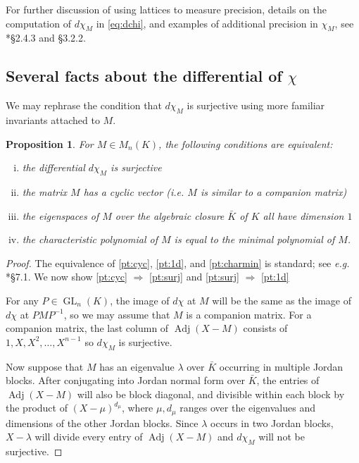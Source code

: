\documentclass[sigconf]{acmart}
\DeclareMathOperator{\GL}{GL}
\DeclareMathOperator{\adj}{Adj}
\newtheorem{prop}[theo]{Proposition}
\theoremstyle{definition}
\begin{document}
For further discussion of using lattices to measure precision,
details on the computation of $d\chi_M$ in \eqref{eq:dchi}, and 
examples of additional precision in $\chi_M$,
see \cite{caruso:17a}*{\S 2.4.3 and \S 3.2.2}.

\subsection{Several facts about the differential of $\chi$}

We may rephrase the condition that $d\chi_M$ is surjective using more familiar invariants attached to $M$.

\begin{prop}
\label{prop:surjectivity}
For $M \in M_n(K)$, the following conditions are equivalent:
\begin{enumerate}[(i)]
\renewcommand{\itemsep}{0pt}
\item \label{pt:surj} the differential $d\chi_M$ is surjective
\item \label{pt:cyc} the matrix $M$ has a cyclic vector (\emph{i.e.} $M$ is similar
to a companion matrix)
\item \label{pt:1d} the eigenspaces of $M$ over the algebraic
closure $\bar{K}$ of $K$ all have dimension $1$
\item \label{pt:charmin} the characteristic polynomial of $M$ is equal to the minimal polynomial of $M$.
\end{enumerate}
\end{prop}

\begin{proof}
The equivalence of \eqref{pt:cyc}, \eqref{pt:1d}, and \eqref{pt:charmin} is standard; see \emph{e.g.}
\cite{hoffman-kunze:LinearAlgebra}*{\S 7.1}.  We now show
\eqref{pt:cyc} $\Rightarrow$ \eqref{pt:surj} and \eqref{pt:surj} $\Rightarrow$ \eqref{pt:1d}

For any $P \in \GL_n(K)$, the image of $d\chi$ at $M$ will be the same
as the image of $d\chi$ at $PMP^{-1}$, so we may assume that
$M$ is a companion matrix.  For a companion matrix, the last column of
$\adj(X{-}M)$ consists of $1, X, X^2, \dots, X^{n-1}$ so $d\chi_M$ is surjective.

Now suppose that $M$ has an eigenvalue $\lambda$ over $\bar{K}$ occurring in multiple Jordan blocks.
After conjugating into Jordan normal form over $\bar{K}$, the entries of $\adj(X{-}M)$
will also be block diagonal, and divisible within each block by the product of $(X-\mu)^{d_\mu}$,
where $\mu, d_\mu$ ranges over the eigenvalues and dimensions of the other Jordan blocks.
Since $\lambda$ occurs in two Jordan blocks,
$X - \lambda$ will divide every entry of $\adj(X{-}M)$ and $d\chi_M$ will not be surjective.
\end{proof}
\end{document}
